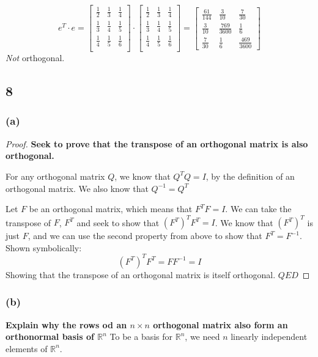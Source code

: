 \documentclass[10pt,letterpaper]{article}
\begin{document}
	$$
	e^T \cdot e = \begin{bmatrix}
	\frac{1}{2} & \frac{1}{3} & \frac{1}{4} \\ 
	\frac{1}{3} & \frac{1}{4} & \frac{1}{5} \\ 
	\frac{1}{4} & \frac{1}{5} & \frac{1}{6} \\ 
	\end{bmatrix} \cdot \begin{bmatrix}
	\frac{1}{2} & \frac{1}{3} & \frac{1}{4} \\ 
	\frac{1}{3} & \frac{1}{4} & \frac{1}{5} \\ 
	\frac{1}{4} & \frac{1}{5} & \frac{1}{6} \\ 
	\end{bmatrix} = \begin{bmatrix} \frac{61}{144} & \frac{3}{10} & \frac{7}{30}\\ \frac{3}{10} & \frac{769}{3600} & \frac{1}{6}\\ \frac{7}{30} & \frac{1}{6} & \frac{469}{3600} \end{bmatrix}
	$$ 
	\textit{Not} orthogonal. 
	\subsection*{8} 
	\subsubsection*{(a)}
	\begin{proof}
		\textbf{Seek to prove that the transpose of an orthogonal matrix is also orthogonal.}
		
		For any orthogonal matrix $Q$, we know that $Q^TQ=I$, by the definition of an orthogonal matrix. We also know that $Q^{-1} = Q^T$
		
		Let $F$ be an orthogonal matrix, which means that $F^TF= I$. We can take the transpose of $F$, $F^T$ and seek to show that $(F^T)^T F^T= I$. We know that $(F^T)^T$ is just $F$, and we can use the second property from above to show that $F^T = F^{-1}$.  Shown symbolically: 
		$$
		(F^T)^T F^T= F F^{-1} = I
		$$
		Showing that the transpose of an orthogonal matrix is itself orthogonal. $QED$
	\end{proof}
	\subsubsection*{(b)}
	\textbf{Explain why the rows od an $n \times n$ orthogonal matrix also form an orthonormal basis of $\mathbb{R}^n$} 
	To be a basis for $\mathbb{R}^n$, we need $n$ linearly independent elements of $\mathbb{R}^n$. 
	
\end{document}
